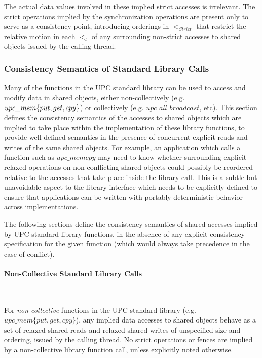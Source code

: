 \documentclass[12pt,titlepage]{article}
\newcounter{parnum}
\newcommand\np{\addtocounter{parnum}{1}\hspace{-2em}\makebox[2em][l]{\arabic{parnum}}}
\begin{document}
\np The actual data values involved in these implied strict accesses
is irrelevant.  The strict operations implied by the synchronization operations 
are present only to serve as a consistency point, introducing orderings in 
$<_{Strict}$ that restrict the relative motion in each $<_t$ of any
surrounding non-strict accesses to shared objects issued by the calling thread.

\subsubsection{Consistency Semantics of Standard Library Calls}

\np Many of the functions in the UPC standard library can be used to 
access and modify data in shared objects, either non-collectively 
(e.g. $upc\_mem\-\{put,get,cpy\}$) or collectively (e.g. $upc\_all\_broadcast$, etc).
This section defines the consistency semantics of the accesses 
to shared objects which are implied to take place within the 
implementation of these library functions, to provide well-defined
semantics in the presence of concurrent explicit reads and writes of the same shared objects.
For example, an application which calls a function such as $upc\_memcpy$ 
may need to know whether surrounding explicit relaxed operations on
non-conflicting shared objects could possibly be reordered relative to the
accesses that take place inside the library call.  This is a subtle but
unavoidable aspect to the library interface which needs to be explicitly
defined to ensure that applications can be written with portably deterministic
behavior across implementations. 

\np The following sections define the consistency semantics of shared accesses
implied by UPC standard library functions, in the absence of any explicit
consistency specification for the given function (which would always take
precedence in the case of conflict).

\paragraph{Non-Collective Standard Library Calls}\ \\

\np  For {\it non-collective} functions in the UPC standard library (e.g. $upc\_mem\{put,get,cpy\}$),
any implied data accesses to shared objects behave as a set of relaxed shared
reads and relaxed shared writes of unspecified size and ordering, issued by the
calling thread. No strict operations or fences are implied by a non-collective
library function call, unless explicitly noted otherwise.
\end{document}
